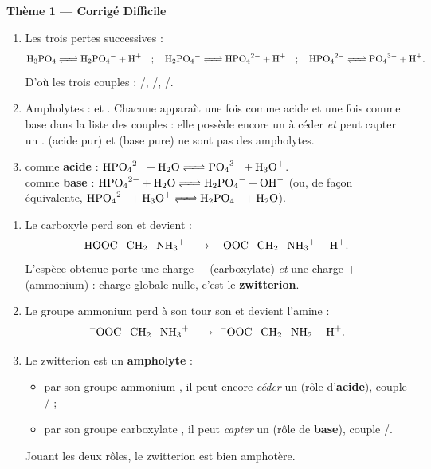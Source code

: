 \documentclass[11pt,a4paper]{article}
\begin{document}
\begin{center}
{\LARGE\bfseries\color{primarydark} Thème 1 --- Corrigé Difficile}
\end{center}

\begin{corrbox}
\begin{enumerate}[label=\alph*),leftmargin=1.6em,itemsep=3pt]
  \item Les trois pertes successives :
  \[ \ce{H3PO4 <=> H2PO4- + H+} \quad;\quad \ce{H2PO4- <=> HPO4^{2-} + H+} \quad;\quad \ce{HPO4^{2-} <=> PO4^{3-} + H+}. \]
  D'où les trois couples : /, /, /.
  \item Ampholytes : \textbf{} et \textbf{}. Chacune apparaît une fois comme acide et
        une fois comme base dans la liste des couples : elle possède encore un  à céder \emph{et} peut
        capter un .  (acide pur) et  (base pure) ne sont pas des ampholytes.
  \item {} comme \textcolor{acidecol}{\textbf{acide}} : $\ce{HPO4^{2-} + H2O <=> PO4^{3-} + H3O+}$.\\
         comme \textcolor{basecol}{\textbf{base}} : $\ce{HPO4^{2-} + H2O <=> H2PO4- + OH-}$
        (ou, de façon équivalente, $\ce{HPO4^{2-} + H3O+ <=> H2PO4- + H2O}$).
\end{enumerate}
\end{corrbox}

\begin{corrbox}
\begin{enumerate}[label=\alph*),leftmargin=1.6em,itemsep=3pt]
  \item Le carboxyle  perd son  et devient  :
  \[ \ce{HOOC-CH2-NH3+} \;\longrightarrow\; \ce{^{-}OOC-CH2-NH3+} + \ce{H+}. \]
  L'espèce obtenue porte une charge $-$ (carboxylate) \emph{et} une charge $+$ (ammonium) : charge globale
  nulle, c'est le \textbf{zwitterion}.
  \item Le groupe ammonium  perd à son tour son  et devient l'amine  :
  \[ \ce{^{-}OOC-CH2-NH3+} \;\longrightarrow\; \ce{^{-}OOC-CH2-NH2} + \ce{H+}. \]
  \item Le zwitterion est un \textbf{ampholyte} :
  \begin{itemize}[leftmargin=1.4em,topsep=1pt,itemsep=1pt]
     \item par son groupe \textcolor{acidecol}{ammonium }, il peut encore \emph{céder} un 
           (rôle d'\textbf{acide}), couple / ;
     \item par son groupe \textcolor{basecol}{carboxylate }, il peut \emph{capter} un 
           (rôle de \textbf{base}), couple /.
  \end{itemize}
  Jouant les deux rôles, le zwitterion est bien amphotère.
\end{enumerate}
\end{corrbox}
\end{document}
